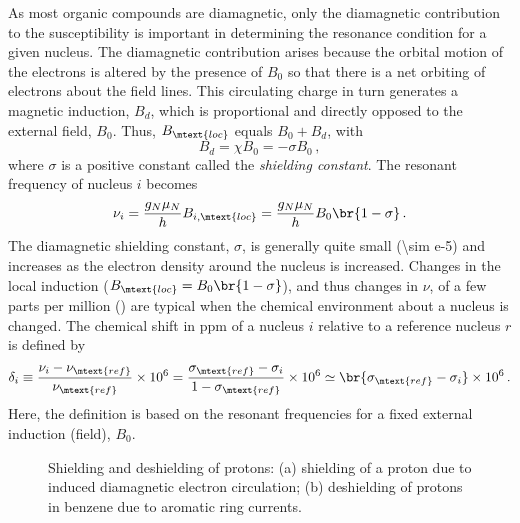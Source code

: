 As most organic compounds are diamagnetic, only the diamagnetic contribution to the susceptibility is important in determining the resonance condition for a given nucleus. 
The diamagnetic contribution arises because the orbital motion of the electrons is altered by the presence of \( B_0 \) so that there is a net orbiting of electrons about the field lines. 
This circulating charge in turn generates a magnetic induction, \( B_d \), which is proportional and directly opposed to the external field, \( B_0 \). 
Thus, \( B_\mtext{loc} \) equals \( B_0 + B_d \), with
\begin{equation}
	B_d = \chi B_0 = -\sigma B_0 \, ,
	\label{eq:B_dia}
\end{equation}
where \( \sigma \) is a positive constant called the \emph{shielding constant}. 
The resonant frequency of nucleus \( i \) becomes 
\begin{equation}
	\nu_i = \frac{g_N \mu_N}{h} B_{i, \mtext{loc}} = \frac{g_N \mu_N}{h} B_0 \br{1 - \sigma} \, .
	\label{eq:chem_shift}
\end{equation} 
The diamagnetic shielding constant, \( \sigma \), is generally quite small (\num{\sim e-5}) and increases as the electron density around the nucleus is increased. 
Changes in the local induction (\( B_\mtext{loc} = B_0 \br{1 - \sigma} \)), and thus changes in \( \nu \), of a few parts per million (\unit{\ppm}) are typical when the chemical environment about a nucleus is changed. 
The chemical shift in \unit{ppm} of a nucleus \( i \) relative to a reference nucleus \( r \) is defined by 
\begin{equation}
	\delta_{i} \equiv 
		\frac{\nu_{i}-\nu_\mtext{ref}}{\nu_\mtext{ref}} \times 10^6 = 
		\frac{\sigma_\mtext{ref} - \sigma_i}{1 - \sigma_\mtext{ref}} \times 10^6 \simeq 
		\br{\sigma_\mtext{ref} - \sigma_i} \times 10^6 \, .
		\label{eq:chem_shift_delta}
\end{equation}
Here, the definition is based on the resonant frequencies for a fixed external induction (field), \( B_0 \). 

\begin{figure}[htb]
  \centering
  
  \caption{Shielding and deshielding of protons: (a) shielding of a proton due to induced diamagnetic electron circulation; (b) deshielding of protons in benzene due to aromatic ring currents.}
  \label{fig:shielding}
\end{figure}
  

